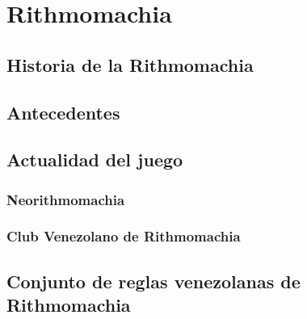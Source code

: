 \chapter{Rithmomachia}

\section{Historia de la Rithmomachia}

\section{Antecedentes}

\section{Actualidad del juego}

\subsection{Neorithmomachia}

\subsection{Club Venezolano de Rithmomachia}

\section{Conjunto de reglas venezolanas de Rithmomachia}
